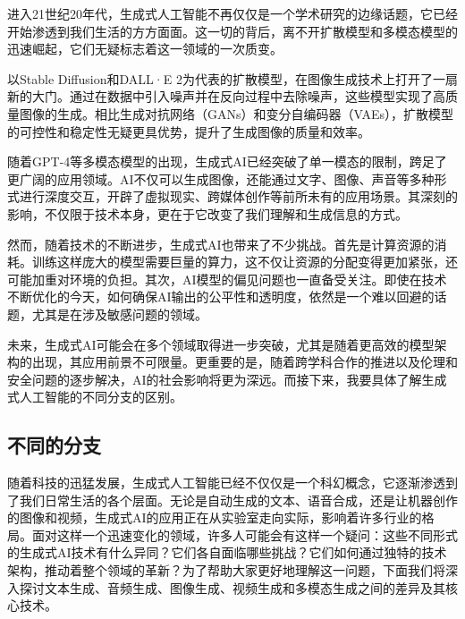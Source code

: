 进入21世纪20年代，生成式人工智能不再仅仅是一个学术研究的边缘话题，它已经开始渗透到我们生活的方方面面。这一切的背后，离不开扩散模型和多模态模型的迅速崛起，它们无疑标志着这一领域的一次质变。

以Stable Diffusion和DALL·E 2为代表的扩散模型，在图像生成技术上打开了一扇新的大门。通过在数据中引入噪声并在反向过程中去除噪声，这些模型实现了高质量图像的生成。相比生成对抗网络（GANs）和变分自编码器（VAEs），扩散模型的可控性和稳定性无疑更具优势，提升了生成图像的质量和效率。

随着GPT-4等多模态模型的出现，生成式AI已经突破了单一模态的限制，跨足了更广阔的应用领域。AI不仅可以生成图像，还能通过文字、图像、声音等多种形式进行深度交互，开辟了虚拟现实、跨媒体创作等前所未有的应用场景。其深刻的影响，不仅限于技术本身，更在于它改变了我们理解和生成信息的方式。

然而，随着技术的不断进步，生成式AI也带来了不少挑战。首先是计算资源的消耗。训练这样庞大的模型需要巨量的算力，这不仅让资源的分配变得更加紧张，还可能加重对环境的负担。其次，AI模型的偏见问题也一直备受关注。即使在技术不断优化的今天，如何确保AI输出的公平性和透明度，依然是一个难以回避的话题，尤其是在涉及敏感问题的领域。

未来，生成式AI可能会在多个领域取得进一步突破，尤其是随着更高效的模型架构的出现，其应用前景不可限量。更重要的是，随着跨学科合作的推进以及伦理和安全问题的逐步解决，AI的社会影响将更为深远。而接下来，我要具体了解生成式人工智能的不同分支的区别。

\subsection{不同的分支}
随着科技的迅猛发展，生成式人工智能已经不仅仅是一个科幻概念，它逐渐渗透到了我们日常生活的各个层面。无论是自动生成的文本、语音合成，还是让机器创作的图像和视频，生成式AI的应用正在从实验室走向实际，影响着许多行业的格局。面对这样一个迅速变化的领域，许多人可能会有这样一个疑问：这些不同形式的生成式AI技术有什么异同？它们各自面临哪些挑战？它们如何通过独特的技术架构，推动着整个领域的革新？为了帮助大家更好地理解这一问题，下面我们将深入探讨文本生成、音频生成、图像生成、视频生成和多模态生成之间的差异及其核心技术。

